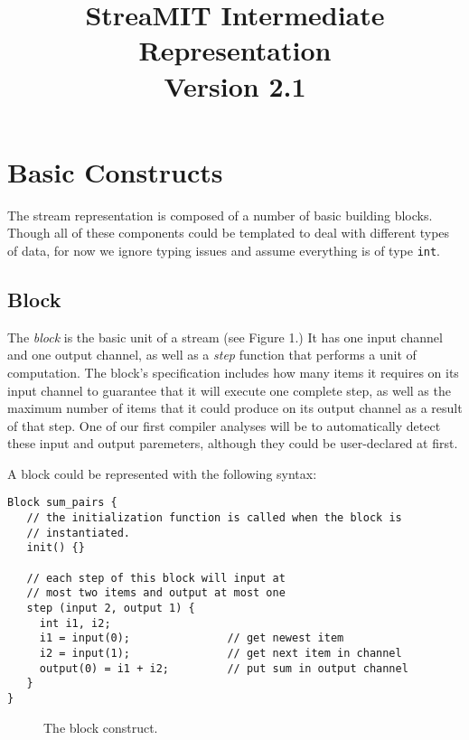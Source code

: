 \title{StreaMIT Intermediate Representation \\ Version 2.1}


\maketitle

\section{Basic Constructs}

The stream representation is composed of a number of basic building
blocks.  Though all of these components could be templated to deal with
different types of data, for now we ignore typing issues and assume
everything is of type {\tt int}.

\subsection{Block}

The {\em block} is the basic unit of a stream (see Figure 1.)  It has
one input channel and one output channel, as well as a {\em step}
function that performs a unit of computation.  The block's specification
includes how many items it requires on its input channel to guarantee
that it will execute one complete step, as well as the maximum number of
items that it could produce on its output channel as a result of that
step.  One of our first compiler analyses will be to automatically
detect these input and output paremeters, although they could be
user-declared at first.

A block could be represented with the following syntax:

\begin{verbatim}
Block sum_pairs {
   // the initialization function is called when the block is 
   // instantiated.
   init() {}

   // each step of this block will input at 
   // most two items and output at most one
   step (input 2, output 1) {
     int i1, i2;
     i1 = input(0);               // get newest item
     i2 = input(1);               // get next item in channel
     output(0) = i1 + i2;         // put sum in output channel
   }
}
\end{verbatim}

\begin{figure}[t]
\centerline{}
\vspace{-24pt}
\caption{\protect\small The block construct.}
\end{figure}

